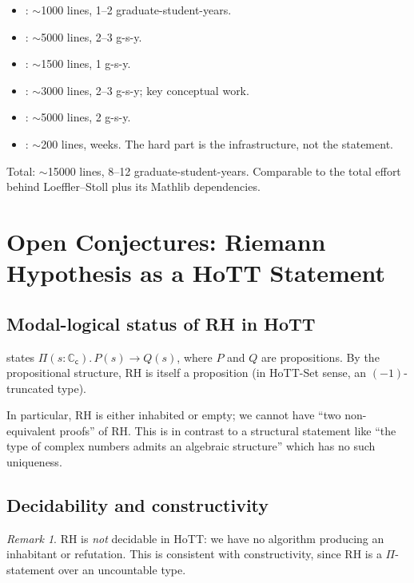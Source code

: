\documentclass[12pt]{article}
\theoremstyle{definition}
\theoremstyle{remark}
\newtheorem{remark}[theorem]{Remark}
\newcommand{\C}{\mathbb{C}}
\newcommand{\Cc}{\C_{\mathsf{c}}}
\begin{document}
\begin{itemize}
\item {}: $\sim$1000 lines, 1--2 graduate-student-years.
\item {}: $\sim$5000 lines, 2--3 g-s-y.
\item {}: $\sim$1500 lines, 1 g-s-y.
\item {}: $\sim$3000 lines, 2--3 g-s-y; key conceptual work.
\item {}: $\sim$5000 lines, 2 g-s-y.
\item {}: $\sim$200 lines, weeks. The hard part is the
infrastructure, not the statement.
\end{itemize}

Total: $\sim$15000 lines, 8--12 graduate-student-years. Comparable to the
total effort behind Loeffler--Stoll plus its Mathlib dependencies.

\section{Open Conjectures: Riemann Hypothesis as a HoTT Statement}\label{sec:rh}

\subsection{Modal-logical status of RH in HoTT}

 states $\Pi(s:\Cc).\, P(s) \to Q(s)$, where $P$ and $Q$ are
propositions. By the propositional structure, $\mathrm{RH}$ is itself a
proposition (in HoTT-Set sense, an $(-1)$-truncated type).

In particular, $\mathrm{RH}$ is either inhabited or empty; we cannot have
``two non-equivalent proofs'' of RH. This is in contrast to a structural
statement like ``the type of complex numbers admits an algebraic structure''
which has no such uniqueness.

\subsection{Decidability and constructivity}

\begin{remark}\label{rem:decidability}
$\mathrm{RH}$ is \emph{not} decidable in HoTT: we have no algorithm
producing an inhabitant or refutation. This is consistent with
constructivity, since $\mathrm{RH}$ is a $\Pi$-statement over an
uncountable type.
\end{remark}
\end{document}
